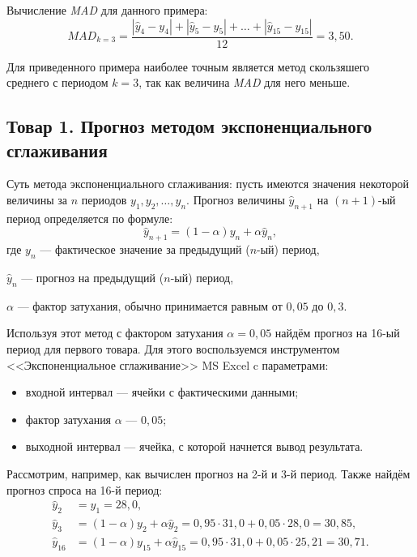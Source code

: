 Вычисление \textit{MAD} для данного примера:
\[
  MAD_{k=3} = \dfrac{|\hat{y}_4 - y_4| + |\hat{y}_5 - y_5| + \dots + |\hat{y}_{15} - y_{15}|}{12} = 3{,}50.
\]

Для приведенного примера наиболее точным является метод скользяшего среднего
с периодом $k = 3$, так как величина \textit{MAD} для него меньше. 


\subsection{Товар 1. Прогноз методом экспоненциального сглаживания}

Суть метода экспоненциального сглаживания: пусть имеются значения некоторой
величины за $n$ периодов $y_1, y_2, \dots, y_n$.
Прогноз величины $\hat{y}_{n+1}$ на $(n+1)\text{-ый}$ период определяется по формуле:
\[
  \hat{y}_{n+1} = (1 - \alpha) y_n + \alpha \hat{y}_n,
\]
где \hspace{2mm} $y_n$ --- фактическое значение за предыдущий ($n$-ый) период, \par 
                 $\hat{y}_n$ --- прогноз на предыдущий ($n$-ый) период, \par
                 $\alpha$ --- фактор затухания, обычно принимается равным от $0{,}05$ до $0{,}3$.

Используя этот метод с фактором затухания $\alpha = 0{,}05$ найдём прогноз на 16-ый период
для первого товара. Для этого воспользуемся инструментом
<<Экспоненциальное сглаживание>> MS Excel c параметрами:
\begin{itemize}
  \item входной интервал --- ячейки с фактическими данными;
  \item фактор затухания $\alpha$ --- $0{,}05$;
  \item выходной интервал --- ячейка, с которой начнется вывод результата.
\end{itemize}

Рассмотрим, например, как вычислен прогноз на 2-й и 3-й период. Также найдём
прогноз спроса на 16-й период:
\begin{align*}
  \hat{y}_2 &= y_1 = 28{,}0, \\
  \hat{y}_3 &= (1 - \alpha) y_2 + \alpha \hat{y}_2 = 0{,}95 \cdot 31{,}0 + 0{,}05 \cdot 28{,}0 = 30{,}85, \\
  \hat{y}_{16} &= (1 - \alpha) y_{15} + \alpha \hat{y}_{15}  = 0{,}95 \cdot 31{,}0 + 0{,}05 \cdot 25{,}21 = 30{,}71.
\end{align*}

